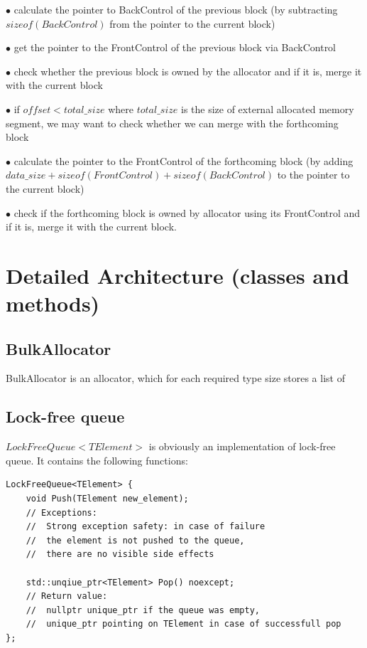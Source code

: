 \documentclass{article}
\begin{document}
$\bullet$ calculate the pointer to BackControl of the previous block (by subtracting $sizeof(BackControl)$ from the pointer to the current block)

$\bullet$ get the pointer to the FrontControl of the previous block via BackControl

$\bullet$ check whether the previous block is owned by the allocator and if it is, merge it with the current block

$\bullet$ if $offset < total\_size$ where $total\_size$ is the size of external allocated memory segment, we may want to check whether we can merge with the forthcoming block

$\bullet$ calculate the pointer to the FrontControl of the forthcoming block (by adding $data\_size + sizeof(FrontControl) + sizeof(BackControl)$ to the pointer to the current block)

$\bullet$ check if the forthcoming block is owned by allocator using its FrontControl and if it is, merge it with the current block.

\newpage

\section{Detailed Architecture (classes and methods)}
\subsection{BulkAllocator}

BulkAllocator is an allocator, which for each required type size stores a list of

\subsection{Lock-free queue}

$LockFreeQueue<TElement>$ is obviously an implementation of lock-free queue. It contains the following functions:


\begin{lstlisting}
LockFreeQueue<TElement> {
	void Push(TElement new_element);
	// Exceptions:
	// 	Strong exception safety: in case of failure
	// 	the element is not pushed to the queue,
	// 	there are no visible side effects

	std::unqiue_ptr<TElement> Pop() noexcept;
	// Return value:
	// 	nullptr unique_ptr if the queue was empty,
	// 	unique_ptr pointing on TElement in case of successfull pop
};
\end{lstlisting}
\end{document}

